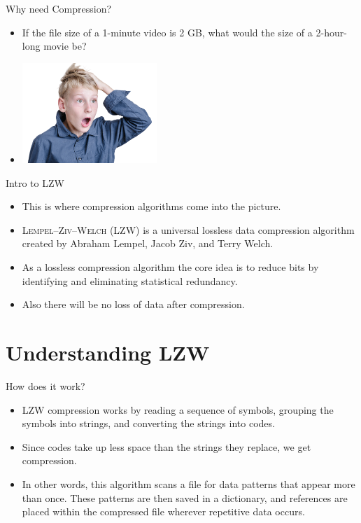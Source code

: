 \documentclass{beamer}
\begin{document}
\begin{frame}{Why need Compression?}
 \begin{itemize}
     \item If the file size of a 1-minute video is 2 GB, what would the size of a 2-hour-long movie be?
     \item \includegraphics[width=0.4\textwidth, height=0.3\textwidth]{assets/surprised.png}
 \end{itemize}
\end{frame}

\begin{frame}{Intro to LZW}
    \begin{itemize}[label=$\blacksquare$]
        \item This is where compression algorithms come into the picture. \\
        \item \textsc{Lempel–Ziv–Welch} (LZW) is a universal lossless data compression algorithm created by Abraham Lempel, Jacob Ziv, and Terry Welch.
        \item As a lossless compression algorithm the core idea is to reduce bits by identifying and eliminating statistical redundancy.
        \item Also there will be no loss of data after compression.
    \end{itemize}
\end{frame}

\section{Understanding LZW}
\begin{frame}{How does it work?}
\begin{itemize}[label=]
\color{orange}
    \item <1->LZW compression works by reading a sequence of symbols, grouping the symbols into strings, and converting the strings into codes.
    \item <2-> Since codes take up less space than the strings they replace, we get compression.
    \item <3-> In other words, this algorithm scans a file for data patterns that appear more than once. These patterns are then saved in a dictionary, and references are placed within the compressed file wherever repetitive data occurs.
\end{itemize}
\end{frame}
\end{document}
